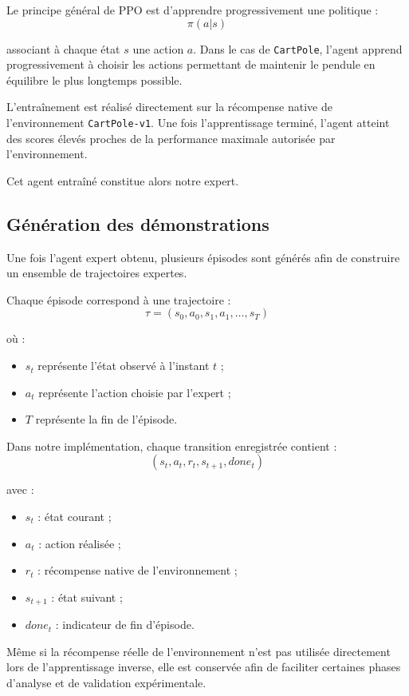 \documentclass{article}
\begin{document}
Le principe général de PPO est d’apprendre progressivement une politique :
\[
\pi(a|s)
\]

associant à chaque état \(s\) une action \(a\). Dans le cas de \texttt{CartPole}, l’agent apprend progressivement à choisir les actions permettant de maintenir le pendule en équilibre le plus longtemps possible.

L’entraînement est réalisé directement sur la récompense native de l’environnement \texttt{CartPole-v1}. Une fois l’apprentissage terminé, l’agent atteint des scores élevés proches de la performance maximale autorisée par l’environnement.

Cet agent entraîné constitue alors notre expert.

\subsection{Génération des démonstrations}

Une fois l’agent expert obtenu, plusieurs épisodes sont générés afin de construire un ensemble de trajectoires expertes.

Chaque épisode correspond à une trajectoire :
\[
\tau = (s_0,a_0,s_1,a_1,\dots,s_T)
\]

où :
\begin{itemize}
    \item \(s_t\) représente l’état observé à l’instant \(t\) ;
    \item \(a_t\) représente l’action choisie par l’expert ;
    \item \(T\) représente la fin de l’épisode.
\end{itemize}

Dans notre implémentation, chaque transition enregistrée contient :
\[
(s_t,a_t,r_t,s_{t+1},done_t)
\]

avec :
\begin{itemize}
    \item \(s_t\) : état courant ;
    \item \(a_t\) : action réalisée ;
    \item \(r_t\) : récompense native de l’environnement ;
    \item \(s_{t+1}\) : état suivant ;
    \item \(done_t\) : indicateur de fin d’épisode.
\end{itemize}

Même si la récompense réelle de l’environnement n’est pas utilisée directement lors de l’apprentissage inverse, elle est conservée afin de faciliter certaines phases d’analyse et de validation expérimentale.
\end{document}
